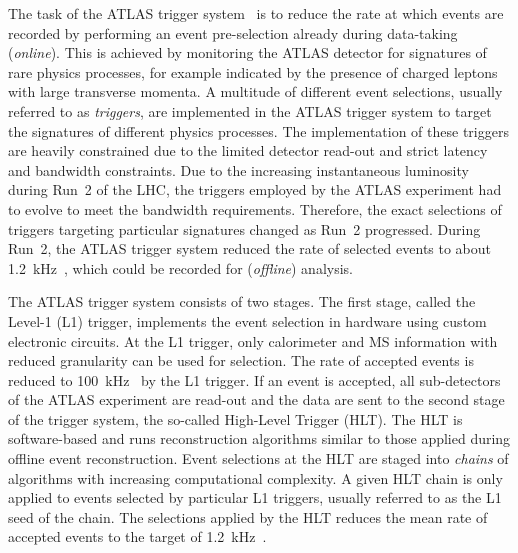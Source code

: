 The task of the ATLAS trigger system~\cite{TRIG-2019-04} is to reduce the rate
at which events are recorded by performing an event pre-selection already during
data-taking (\emph{online}). This is achieved by monitoring the ATLAS detector
for signatures of rare physics processes, for example indicated by the presence
of charged leptons with large transverse momenta. A multitude of different event
selections, usually referred to as \emph{triggers}, are implemented in the ATLAS
trigger system to target the signatures of different physics processes. The
implementation of these triggers are heavily constrained due to the limited
detector read-out and strict latency and bandwidth constraints. Due to the
increasing instantaneous luminosity during Run~2 of the LHC, the triggers
employed by the ATLAS experiment had to evolve to meet the bandwidth
requirements. Therefore, the exact selections of triggers targeting particular
signatures changed as Run~2 progressed. During Run~2, the ATLAS trigger system
reduced the rate of selected events to about
\SI{1.2}{\kilo\hertz}~\cite{TRIG-2019-04}, which could be recorded for
(\emph{offline}) analysis.

The ATLAS trigger system consists of two stages. The first stage, called the
Level-1 (L1) trigger, implements the event selection in hardware using custom
electronic circuits. At the L1 trigger, only calorimeter and MS information with
reduced granularity can be used for selection. The rate of accepted events is
reduced to \SI{100}{\kilo\hertz}~\cite{TRIG-2019-04} by the L1 trigger. If an
event is accepted, all sub-detectors of the ATLAS experiment are read-out and
the data are sent to the second stage of the trigger system, the so-called
High-Level Trigger (HLT). The HLT is software-based and runs reconstruction
algorithms similar to those applied during offline event reconstruction.  Event
selections at the HLT are staged into \emph{chains} of algorithms with
increasing computational complexity. A given HLT chain is only applied to events
selected by particular L1 triggers, usually referred to as the L1 seed of the
chain. The selections applied by the HLT reduces the mean rate of accepted
events to the target of \SI{1.2}{\kilo\hertz}~\cite{TRIG-2019-04}.


